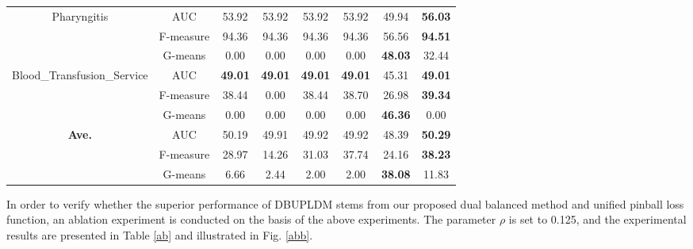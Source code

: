 \documentclass[a4paper]{cas-sc}
\begin{document}
\begin{table}[htbp]
\begin{tabular}{cccccccc}
    \midrule
    \multicolumn{1}{c}{\multirow{3}[2]{*}{Pharyngitis}} & AUC   & 53.92  & 53.92 & 53.92 & 53.92 & 49.94 & \textbf{56.03} \\
          & F-measure & 94.36  & 94.36 & 94.36 & 94.36 & 56.56 & \textbf{94.51} \\
          & G-means & 0.00  & 0.00  & 0.00  & 0.00  & \textbf{48.03} & 32.44 \\
    \midrule
    \multicolumn{1}{c}{\multirow{3}[2]{*}{Blood\_Transfusion\_Service}} & AUC   & \textbf{49.01 } & \textbf{49.01} & \textbf{49.01} & \textbf{49.01} & 45.31 & \textbf{49.01} \\
          & F-measure & 38.44  & 0.00  & 38.44 & 38.70 & 26.98 & \textbf{39.34} \\
          & G-means & 0.00  & 0.00  & 0.00  & 0.00  & \textbf{46.36} & 0.00 \\
    \midrule
    \multirow{3}[2]{*}{\textbf{Ave. }} & AUC   & 50.19  & 49.91  & 49.92  & 49.92  & 48.39  & \textbf{50.29 } \\
          & F-measure & 28.97  & 14.26  & 31.03  & 37.74  & 24.16  & \textbf{38.23 } \\
          & G-means & 6.66  & 2.44  & 2.00  & 2.00  & \textbf{38.08 } & 11.83  \\
    \bottomrule
    \end{tabular}%
\end{table}%

In order to verify whether the superior performance of DBUPLDM stems from our proposed dual balanced method and unified pinball loss function, an ablation experiment is conducted on the basis of the above experiments. The parameter $\rho$ is set to 0.125, and the experimental results are presented in Table \ref{ab} and illustrated in Fig. \ref{abb}.
\end{document}
